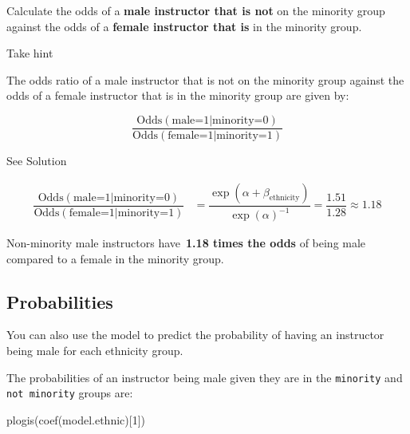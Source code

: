 \documentclass[
  letterpaper,
  DIV=11,
  numbers=noendperiod]{scrartcl}
\newenvironment{Shaded}{\begin{snugshade}}{\end{snugshade}}
\newcommand{\DecValTok}[1]{\textcolor[rgb]{0.68,0.00,0.00}{#1}}
\newcommand{\FunctionTok}[1]{\textcolor[rgb]{0.28,0.35,0.67}{#1}}
\newcommand{\NormalTok}[1]{\textcolor[rgb]{0.00,0.23,0.31}{#1}}
\begin{document}
\begin{tcolorbox}[enhanced jigsaw, colframe=quarto-callout-warning-color-frame, toprule=.15mm, toptitle=1mm, opacitybacktitle=0.6, breakable, colback=white, opacityback=0, title={Task}, rightrule=.15mm, bottomrule=.15mm, coltitle=black, colbacktitle=quarto-callout-warning-color!10!white, leftrule=.75mm, left=2mm, arc=.35mm, bottomtitle=1mm, titlerule=0mm]

Calculate the odds of a \textbf{male instructor that is not} on the
minority group against the odds of a \textbf{female instructor that is}
in the minority group.

Take hint

The odds ratio of a male instructor that is not on the minority group
against the odds of a female instructor that is in the minority group
are given by:

\[
\dfrac{\text{Odds}(\text{male=1|minority=0})}{\text{Odds}(\text{female=1|minority=1})}
\]

See Solution

\[
\begin{aligned}
\dfrac{\text{Odds}(\text{male=1|minority=0})}{\text{Odds}(\text{female=1|minority=1})} &= \dfrac{\exp(\alpha+\beta_{\text{ethnicity}}) }{\exp(\alpha)^{-1}} = \dfrac{1.51}{1.28} \approx 1.18
\end{aligned}
\]

Non-minority male instructors have~\textbf{1.18 times the odds} of being
male compared to a female in the minority group.

\end{tcolorbox}

\subsection{Probabilities}\label{probabilities-1}

You can also use the model to predict the probability of having an
instructor being male for each ethnicity group.

The probabilities of an instructor being male given they are in the
\texttt{minority} and \texttt{not\ minority} groups are:

\begin{Shaded}
\begin{Highlighting}[]
\FunctionTok{plogis}\NormalTok{(}\FunctionTok{coef}\NormalTok{(model.ethnic)[}\DecValTok{1}\NormalTok{])}
\end{Highlighting}
\end{Shaded}
\end{document}
